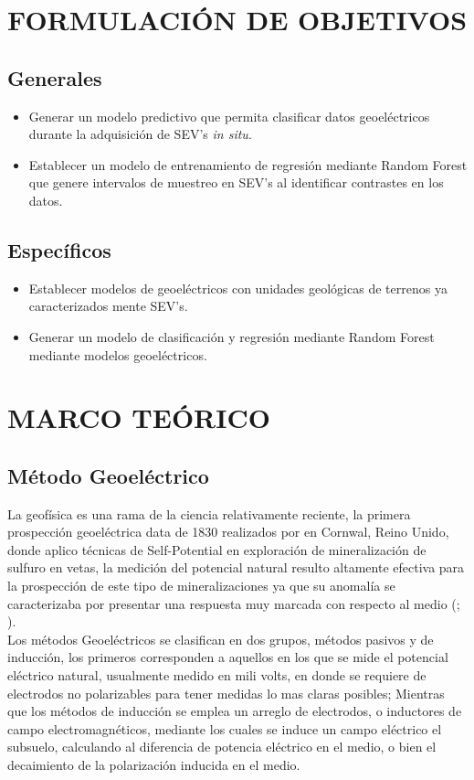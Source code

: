 \chapter{FORMULACIÓN DE OBJETIVOS}

\section{Generales}

\begin{itemize}
	\item Generar un modelo predictivo que permita clasificar datos geoeléctricos durante la adquisición de SEV's \textit{in situ}.
	\item Establecer un modelo de entrenamiento de regresión mediante Random Forest que genere intervalos de muestreo en SEV's al identificar contrastes en los datos.
\end{itemize}

\section{Específicos}


\begin{itemize}
	\item Establecer modelos de geoeléctricos con unidades geológicas de terrenos ya caracterizados mente SEV's.
	\item Generar un modelo de clasificación y regresión mediante Random Forest mediante modelos geoeléctricos.
\end{itemize}
\newpage
\chapter{MARCO TEÓRICO}
	\section{Método Geoeléctrico}
		La geofísica es una rama de la ciencia relativamente reciente, la primera prospección geoeléctrica data de 1830 realizados por \cite{fox1830} en Cornwal, Reino Unido, donde aplico técnicas de Self-Potential en exploración de mineralización de sulfuro en vetas, la medición del potencial natural resulto altamente efectiva para la prospección de este tipo de mineralizaciones ya que su anomalía se caracterizaba por presentar una respuesta muy marcada con respecto al medio (\cite{revil2013}; \cite{reynolds2011}).\\
		
		Los métodos Geoeléctricos se clasifican en dos grupos, métodos pasivos y de inducción, los primeros corresponden a aquellos en los que se mide el potencial eléctrico natural, usualmente medido en mili volts, en donde se requiere de electrodos no polarizables para tener medidas lo mas claras posibles; Mientras que los métodos de inducción se emplea un arreglo de electrodos, o inductores de campo electromagnéticos, mediante los cuales se induce un campo eléctrico el subsuelo, calculando al diferencia de potencia eléctrico en el medio, o bien el decaimiento de la polarización inducida en el medio.\\
		
